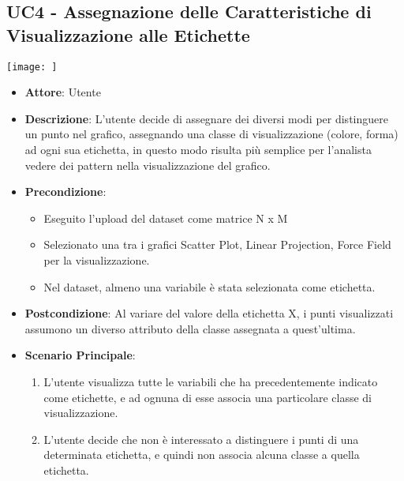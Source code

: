     \subsection{UC4 - Assegnazione delle Caratteristiche di Visualizzazione alle Etichette}
    \texttt{[image: ]}
    \begin{itemize}
    \item \textbf{Attore}: Utente
    \item \textbf{Descrizione}: L'utente decide di assegnare dei diversi modi per distinguere un punto nel grafico, assegnando una classe di visualizzazione (colore, forma) ad ogni sua etichetta, in questo modo risulta più semplice per l'analista vedere dei pattern nella visualizzazione del grafico.
    \item \textbf{Precondizione}:
    \begin{itemize}
        \item Eseguito l'upload del dataset come matrice N x M
        \item Selezionato una tra i grafici Scatter Plot, Linear Projection, Force Field per la visualizzazione.
        \item Nel dataset, almeno una variabile è stata selezionata come etichetta.
    \end{itemize}
    \item \textbf{Postcondizione}: Al variare del valore della etichetta X, i punti visualizzati assumono un diverso attributo della classe assegnata a quest'ultima.
    \item \textbf{Scenario Principale}: 
    \begin{enumerate}
        \item L'utente visualizza tutte le variabili che ha precedentemente indicato come etichette, e ad ognuna di esse associa una particolare classe di visualizzazione. 
        \item L'utente decide che non è interessato a distinguere i punti di una determinata etichetta, e quindi non associa alcuna classe a quella etichetta.
    \end{enumerate}  
    \end{itemize}
    
